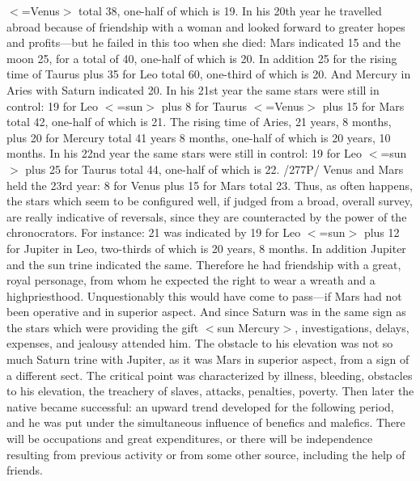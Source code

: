 $<$=Venus$>$ total 38, one-half of which is 19. In his 20th year he travelled abroad because of friendship with
a woman and looked forward to greater hopes and profits—but he failed in this too when she died: Mars
indicated 15 and the moon 25, for a total of 40, one-half of which is 20. In addition 25 for the rising time
of Taurus plus 35 for Leo total 60, one-third of which is 20. And Mercury in Aries with Saturn indicated
20. In his 21st year the same stars were still in control: 19 for Leo $<$=sun$>$ plus 8 for Taurus $<$=Venus$>$
plus 15 for Mars total 42, one-half of which is 21. The rising time of Aries, 21 years, 8 months, plus 20
for Mercury total 41 years 8 months, one-half of which is 20 years, 10 months. In his 22nd year the same
stars were still in control: 19 for Leo $<$=sun$>$ plus 25 for Taurus total 44, one-half of which is 22. /277P/
Venus and Mars held the 23rd year: 8 for Venus plus 15 for Mars total 23.
Thus, as often happens, the stars which seem to be configured well, if judged from a broad, overall
survey, are really indicative of reversals, since they are counteracted by the power of the chronocrators. For
instance: 21 was indicated by 19 for Leo $<$=sun$>$ plus 12 for Jupiter in Leo, two-thirds of which is 20
years, 8 months. In addition Jupiter and the sun trine indicated the same. Therefore he had friendship with
a great, royal personage, from whom he expected the right to wear a wreath and a highpriesthood.
Unquestionably this would have come to pass—if Mars had not been operative and in superior aspect. And
since Saturn was in the same sign as the stars which were providing the gift $<$sun Mercury$>$,
investigations, delays, expenses, and jealousy attended him. The obstacle to his elevation was not so
much Saturn trine with Jupiter, as it was Mars in superior aspect, from a sign of a different sect. The
critical point was characterized by illness, bleeding, obstacles to his elevation, the treachery of slaves,
attacks, penalties, poverty. Then later the native became successful: an upward trend developed for the
following period, and he was put under the simultaneous influence of benefics and malefics. There will be
occupations and great expenditures, or there will be independence resulting from previous activity or from
some other source, including the help of friends.

